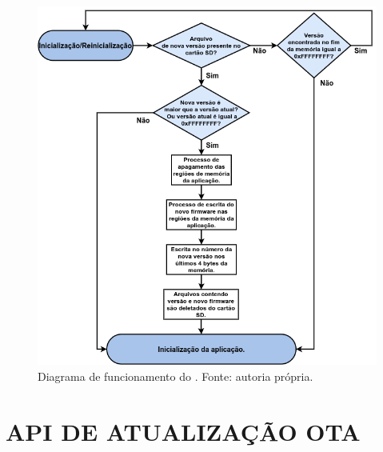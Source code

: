 \begin{figure}[H]
    \scriptsize
     \centering
     \includegraphics[scale=0.6]{dados/figuras/FuncionamentoBootloader.png}
     \caption{Diagrama de funcionamento do \bootloader. \newline Fonte: autoria própria.}
     \label{fig:DiagBootloader}
\end{figure}



\section{API DE ATUALIZAÇÃO OTA}
\label{sec:API}

